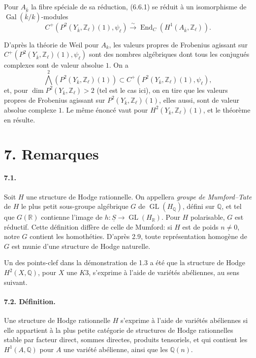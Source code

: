 \documentclass[10pt,leqno]{article}
\newcommand{\Q}{\mathbb{Q}}
\newcommand{\R}{\mathbb{R}}
\newcommand{\Z}{\mathbb{Z}}
\newcommand{\Gal}{\operatorname{Gal}}
\newcommand{\End}{\operatorname{End}}
\newcommand{\GL}{\operatorname{GL}}
\newcommand{\iso}{\xrightarrow{\sim}}
\begin{document}
Pour $A_{\overline k}$ la fibre spéciale de sa réduction, (6.6.1) se réduit à un isomorphisme de $\Gal(\overline k/k)$-modules
\[
\tag{6.6.2}
C^+(P^2(Y_{\overline k},\Z_\ell)(1),\psi_\ell)\iso
\End_C(H^1(A_{\overline k},\Z_\ell)).
\]

\clearpage

D'après la théorie de Weil pour $A_k$, les valeurs propres de Frobenius agissant sur $C^+(P^2(Y_{\overline k},\Z_\ell)(1),\psi_\ell)$ sont des nombres algébriques dont tous les conjugués complexes sont de valeur absolue $1$. On a
\[
\mathop{\bigwedge}\limits^2(P^2(Y_{\overline k},\Z_\ell)(1))
\subset C^+(P^2(Y_{\overline k},\Z_\ell)(1),\psi_\ell),
\]
et, pour $\dim P^2(Y_{\overline k},\Z_\ell)>2$ (tel est le cas ici), on en tire que les valeurs propres de Frobenius agissant sur $P^2(Y_{\overline k},\Z_\ell)(1)$, elles aussi, sont de valeur absolue complexe $1$. Le même énoncé vaut pour $H^2(Y_{\overline k},\Z_\ell)(1)$, et le théorème en résulte.

\section*{7. Remarques}

\paragraph{7.1.} Soit $H$ une structure de Hodge rationnelle. On appellera \emph{groupe de Mumford--Tate} de $H$ le plus petit sous-groupe algébrique $G$ de $\GL(H_\Q)$, défini sur $\Q$, et tel que $G(\R)$ contienne l'image de $h:\underline S\to\GL(H_\R)$. Pour $H$ polarisable, $G$ est réductif. Cette définition diffère de celle de Mumford: si $H$ est de poids $n\ne0$, notre $G$ contient les homothéties. D'après 2.9, toute représentation homogène de $G$ est munie d'une structure de Hodge naturelle.

Un des points-clef dans la démonstration de 1.3 a été que la structure de Hodge $H^2(X,\Q)$, pour $X$ une $K3$, \guillemotleft{}s'exprime\guillemotright{} à l'aide de variétés abéliennes, au sens suivant.

\paragraph{7.2. Définition.} Une structure de Hodge rationnelle $H$ s'exprime à l'aide de variétés abéliennes si elle appartient à la plus petite catégorie de structures de Hodge rationnelles stable par facteur direct, sommes directes, produits tensoriels, et qui contient les $H^1(A,\Q)$ pour $A$ une variété abélienne, ainsi que les $\Q(n)$.
\end{document}
